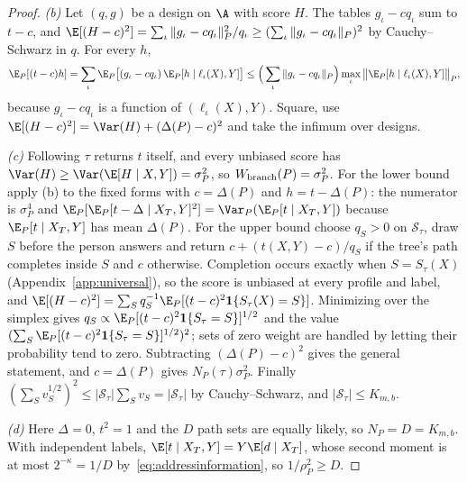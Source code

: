 \begin{proof}
\emph{(b)} Let $(q,g)$ be a design on $\A$ with score $H$. The tables
$g_\iota-cq_\iota$ sum to $t-c$, and
$\E[(H-c)^2]=\sum_\iota\|g_\iota-cq_\iota\|_P^2/q_\iota\ge(\sum_\iota\|g_\iota-cq_\iota\|_P)^2$
by Cauchy--Schwarz in $q$. For every $h$,
\[
 \E_P[(t-c)h]=\sum_\iota\E_P\big[(g_\iota-cq_\iota)\,\E_P[h\mid\ell_\iota(X),Y]\big]
 \le\Big(\sum_\iota\|g_\iota-cq_\iota\|_P\Big)\max_\iota\big\|\E_P[h\mid\ell_\iota(X),Y]\big\|_P,
\]
because $g_\iota-cq_\iota$ is a function of $(\ell_\iota(X),Y)$. Square, use
$\E[(H-c)^2]=\Var(H)+(\Delta(P)-c)^2$ and take the infimum over designs.

\emph{(c)} Following $\tau$ returns $t$ itself, and every unbiased score has
$\Var(H)\ge\Var(\E[H\mid X,Y])=\sigma_P^2$, so $W_{\rm branch}(P)=\sigma_P^2$.
For the lower bound apply (b) to the fixed forms with $c=\Delta(P)$ and
$h=t-\Delta(P)$: the numerator is $\sigma_P^4$ and
$\E_P[\E_P[t-\Delta\mid X_T,Y]^2]=\Var_P(\E_P[t\mid X_T,Y])$ because
$\E_P[t\mid X_T,Y]$ has mean $\Delta(P)$. For the upper bound choose $q_S>0$
on $\mathcal S_\tau$, draw $S$ before the person answers and return
$c+(t(X,Y)-c)/q_S$ if the tree's path completes inside $S$ and $c$ otherwise.
Completion occurs exactly when $S=S_\tau(X)$
(Appendix~\ref{app:universal}), so the score is unbiased at every profile and
label, and $\E[(H-c)^2]=\sum_Sq_S^{-1}\E_P[(t-c)^2\mathbf 1\{S_\tau(X)=S\}]$.
Minimizing over the simplex gives
$q_S\propto\E_P[(t-c)^2\mathbf 1\{S_\tau=S\}]^{1/2}$ and the value
$(\sum_S\E_P[(t-c)^2\mathbf 1\{S_\tau=S\}]^{1/2})^2$; sets of zero weight are
handled by letting their probability tend to zero. Subtracting
$(\Delta(P)-c)^2$ gives the general statement, and $c=\Delta(P)$ gives
$N_P(\tau)\sigma_P^2$. Finally $(\sum_Sv_S^{1/2})^2\le|\mathcal S_\tau|\sum_Sv_S=|\mathcal S_\tau|$
by Cauchy--Schwarz, and $|\mathcal S_\tau|\le K_{m,b}$.

\emph{(d)} Here $\Delta=0$, $t^2=1$ and the $D$ path sets are equally likely,
so $N_P=D=K_{m,b}$. With independent labels,
$\E[t\mid X_T,Y]=Y\E[d\mid X_T]$, whose second moment is at most $2^{-\kappa}=1/D$
by~\eqref{eq:addressinformation}, so $1/\rho_P^2\ge D$.
\end{proof}

